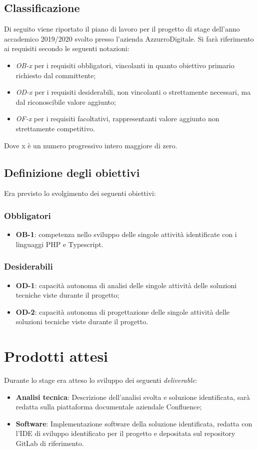 \subsection{Classificazione}
Di seguito viene riportato il piano di lavoro per il progetto di stage dell'anno accademico 2019/2020 svolto presso l'azienda AzzurroDigitale.
Si farà riferimento ai requisiti secondo le seguenti notazioni:
\begin{itemize}
	\item \textit{OB-x} per i requisiti obbligatori, vincolanti in quanto obiettivo primario richiesto dal committente;
	\item \textit{OD-x} per i requisiti desiderabili, non vincolanti o strettamente necessari,
	ma dal riconoscibile valore aggiunto;
	\item \textit{OF-x} per i requisiti facoltativi, rappresentanti valore aggiunto non strettamente competitivo.
\end{itemize}
Dove x è un numero progressivo intero maggiore di zero.

\subsection{Definizione degli obiettivi}
Era previsto lo svolgimento dei seguenti obiettivi:
\subsubsection*{Obbligatori}
\begin{itemize}
 \item \textbf{OB-1}: competenza nello sviluppo delle singole attività identificate con i linguaggi \gls{PHP} e Typescript.
\end{itemize}
\subsubsection*{Desiderabili} 
\begin{itemize}
 \item \textbf{OD-1}: capacità autonoma di analisi delle singole attività delle soluzioni tecniche viste durante il progetto;
\item \textbf{OD-2}: capacità autonoma di progettazione delle singole attività delle soluzioni tecniche viste durante il progetto.
\end{itemize}

\section{Prodotti attesi}
Durante lo stage era atteso lo sviluppo dei seguenti \emph{deliverable}:
\begin{itemize}
	\item \textbf{Analisi tecnica}: Descrizione dell’analisi svolta e soluzione identificata, sarà redatta sulla piattaforma documentale aziendale Confluence;
	\item \textbf{Software}: Implementazione software della soluzione identificata, redatta con l’IDE di sviluppo identificato per il progetto e depositata sul repository GitLab di riferimento.
\end{itemize}

